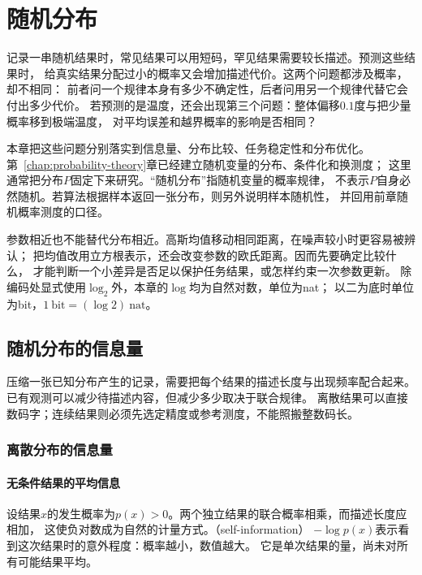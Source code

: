 \chapter{随机分布}
\label{chap:information-theory-and-statistical-geometry}

记录一串随机结果时，常见结果可以用短码，罕见结果需要较长描述。预测这些结果时，
给真实结果分配过小的概率又会增加描述代价。这两个问题都涉及概率，却不相同：
前者问一个规律本身有多少不确定性，后者问用另一个规律代替它会付出多少代价。
若预测的是温度，还会出现第三个问题：整体偏移\(0.1\)度与把少量概率移到极端温度，
对平均误差和越界概率的影响是否相同？

本章把这些问题分别落实到信息量、分布比较、任务稳定性和分布优化。
第~\ref{chap:probability-theory}章已经建立随机变量的分布、条件化和换测度；
这里通常把分布\(P\)固定下来研究。“随机分布”指随机变量的概率规律，
不表示\(P\)自身必然随机。若算法根据样本返回一张分布，则另外说明样本随机性，
并回用前章随机概率测度的口径。

参数相近也不能替代分布相近。高斯均值移动相同距离，在噪声较小时更容易被辨认；
把均值改用立方根表示，还会改变参数的欧氏距离。因而先要确定比较什么，
才能判断一个小差异是否足以保护任务结果，或怎样约束一次参数更新。
除编码处显式使用\(\log_2\)外，本章的\(\log\)均为自然对数，单位为nat；
以二为底时单位为bit，\(1\ \mathrm{bit}=(\log2)\ \mathrm{nat}\)。

\section{随机分布的信息量}
\label{sec:information-uncertainty-prediction}

压缩一张已知分布产生的记录，需要把每个结果的描述长度与出现频率配合起来。
已有观测可以减少待描述内容，但减少多少取决于联合规律。
离散结果可以直接数码字；连续结果则必须先选定精度或参考测度，不能照搬整数码长。

\subsection{离散分布的信息量}
\label{sec:information-entropy}

\subsubsection{无条件结果的平均信息}
\label{sec:information-unconditional-information}

设结果\(x\)的发生概率为\(p(x)>0\)。两个独立结果的联合概率相乘，而描述长度应相加，
这使负对数成为自然的计量方式。（self-information）
\(-\log p(x)\)表示看到这次结果时的意外程度：概率越小，数值越大。
它是单次结果的量，尚未对所有可能结果平均。

